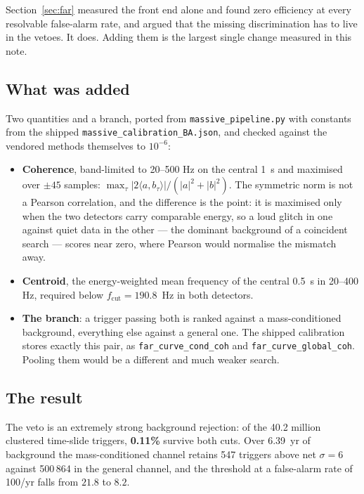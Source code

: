 \documentclass[11pt]{article}
\begin{document}
Section~\ref{sec:far} measured the front end alone and found zero efficiency at every
resolvable false-alarm rate, and argued that the missing discrimination has to live in
the vetoes. It does. Adding them is the largest single change measured in this note.

\subsection*{What was added}

Two quantities and a branch, ported from \texttt{massive\_pipeline.py} with constants
from the shipped \texttt{massive\_calibration\_BA.json}, and checked against the
vendored methods themselves to $10^{-6}$:

\begin{itemize}
\item \textbf{Coherence}, band-limited to 20--500 Hz on the central 1~s and maximised
over $\pm 45$ samples: $\max_\tau |2\langle a, b_\tau\rangle| / (|a|^2 + |b|^2)$. The
symmetric norm is not a Pearson correlation, and the difference is the point: it is
maximised only when the two detectors carry comparable energy, so a loud glitch in one
against quiet data in the other --- the dominant background of a coincident search ---
scores near zero, where Pearson would normalise the mismatch away.
\item \textbf{Centroid}, the energy-weighted mean frequency of the central 0.5~s in
20--400 Hz, required below $f_\mathrm{cut} = 190.8$~Hz in both detectors.
\item \textbf{The branch}: a trigger passing both is ranked against a mass-conditioned
background, everything else against a general one. The shipped calibration stores
exactly this pair, as \texttt{far\_curve\_cond\_coh} and \texttt{far\_curve\_global\_coh}.
Pooling them would be a different and much weaker search.
\end{itemize}

\subsection*{The result}

The veto is an extremely strong background rejection: of the 40.2 million clustered
time-slide triggers, \textbf{0.11\%} survive both cuts. Over 6.39~yr of background the
mass-conditioned channel retains 547 triggers above net $\sigma = 6$ against 500\,864 in
the general channel, and the threshold at a false-alarm rate of 100/yr falls from
$21.8$ to $\mathbf{8.2}$.
\end{document}
